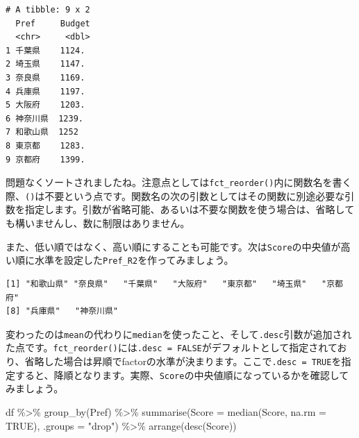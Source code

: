 \documentclass[
  a4paper,
  pandoc,
  ja=standard,
  jafont=haranoaji]{bxjsbook}
\newenvironment{Shaded}{\begin{snugshade}}{\end{snugshade}}
\newcommand{\AttributeTok}[1]{\textcolor[rgb]{0.00,0.48,0.65}{#1}}
\newcommand{\ConstantTok}[1]{\textcolor[rgb]{0.56,0.35,0.01}{#1}}
\newcommand{\FunctionTok}[1]{\textcolor[rgb]{0.28,0.35,0.67}{#1}}
\newcommand{\NormalTok}[1]{\textcolor[rgb]{0.00,0.48,0.65}{#1}}
\newcommand{\OtherTok}[1]{\textcolor[rgb]{0.00,0.48,0.65}{#1}}
\newcommand{\SpecialCharTok}[1]{\textcolor[rgb]{0.37,0.37,0.37}{#1}}
\newcommand{\StringTok}[1]{\textcolor[rgb]{0.13,0.47,0.30}{#1}}
\begin{document}
\begin{verbatim}
# A tibble: 9 x 2
  Pref     Budget
  <chr>     <dbl>
1 千葉県    1124.
2 埼玉県    1147.
3 奈良県    1169.
4 兵庫県    1197.
5 大阪府    1203.
6 神奈川県  1239.
7 和歌山県  1252 
8 東京都    1283.
9 京都府    1399.
\end{verbatim}

問題なくソートされましたね。注意点としては\texttt{fct\_reorder()}内に関数名を書く際、\texttt{()}は不要という点です。関数名の次の引数としてはその関数に別途必要な引数を指定します。引数が省略可能、あるいは不要な関数を使う場合は、省略しても構いませんし、数に制限はありません。

また、低い順ではなく、高い順にすることも可能です。次は\texttt{Score}の中央値が高い順に水準を設定した\texttt{Pref\_R2}を作ってみましょう。

\begin{Shaded}
\end{Shaded}

\begin{verbatim}
[1] "和歌山県" "奈良県"   "千葉県"   "大阪府"   "東京都"   "埼玉県"   "京都府"  
[8] "兵庫県"   "神奈川県"
\end{verbatim}

変わったのは\texttt{mean}の代わりに\texttt{median}を使ったこと、そして\texttt{.desc}引数が追加された点です。\texttt{fct\_reorder()}には\texttt{.desc\ =\ FALSE}がデフォルトとして指定されており、省略した場合は昇順でfactorの水準が決まります。ここで\texttt{.desc\ =\ TRUE}を指定すると、降順となります。実際、\texttt{Score}の中央値順になっているかを確認してみましょう。

\begin{Shaded}
\begin{Highlighting}[numbers=left,,]
\NormalTok{df }\SpecialCharTok{\%\textgreater{}\%} 
  \FunctionTok{group\_by}\NormalTok{(Pref) }\SpecialCharTok{\%\textgreater{}\%}
  \FunctionTok{summarise}\NormalTok{(}\AttributeTok{Score   =} \FunctionTok{median}\NormalTok{(Score, }\AttributeTok{na.rm =} \ConstantTok{TRUE}\NormalTok{),}
            \AttributeTok{.groups =} \StringTok{"drop"}\NormalTok{) }\SpecialCharTok{\%\textgreater{}\%}
  \FunctionTok{arrange}\NormalTok{(}\FunctionTok{desc}\NormalTok{(Score))}
\end{Highlighting}
\end{Shaded}
\end{document}
